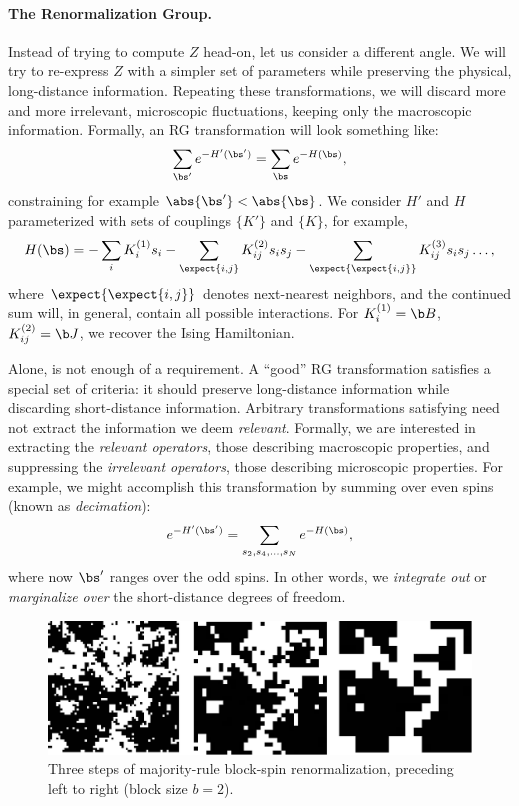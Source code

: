 \paragraph{The Renormalization Group.} Instead of trying to compute
$Z$ head-on, let us consider a different angle.  We will try to
re-express $Z$ with a simpler set of parameters while preserving the
physical, long-distance information. Repeating these transformations,
we will discard more and more irrelevant, microscopic fluctuations,
keeping only the macroscopic information. Formally, an RG
transformation will look something like:
\begin{equation}%
  \sum_{\bs'}e^{-H'(\bs')}=\sum_{\bs}e^{-H(\bs)},
  \label{eq:rg-transformation-general}
\end{equation}%
constraining for example $\abs{\bs'}<\abs{\bs}$. We consider $H'$ and
$H$ parameterized with sets of couplings $\{K'\}$ and $\{K\}$, for
example,%
\begin{equation}%
  H(\bs)=-\sum_i K^{(1)}_{i} s_i - \sum_{\expect{i,j}}K^{(2)}_{ij}s_i s_j-\sum_{\expect{\expect{i,j}}}K^{(3)}_{ij}s_i s_j\ldots,
\end{equation}%
where $\expect{\expect{i,j}}$ denotes next-nearest neighbors, and the
continued sum will, in general, contain all possible interactions. For
$K^{(1)}_i=\b B$, $K^{(2)}_{ij}=\b J$, we recover the Ising
Hamiltonian.

Alone,  is not enough of a
requirement. A ``good'' RG transformation satisfies a special set of
criteria: it should preserve long-distance information while
discarding short-distance information. Arbitrary transformations
satisfying  need not extract the
information we deem \textit{relevant}. Formally, we are interested in
extracting the \textit{relevant operators}, those describing
macroscopic properties, and suppressing the \textit{irrelevant
  operators}, those describing microscopic properties.  For example,
we might accomplish this transformation by summing over even spins
(known as \textit{decimation}):
\begin{equation}%
  e^{-H'(\bs')}=\sum_{s_2,s_4,\ldots,s_N} e^{-H(\bs)},
\end{equation}%
where now $\bs'$ ranges over the odd spins. In other words, we
\textit{integrate out} or \textit{marginalize over} the short-distance
degrees of freedom.

\begin{figure}[ht]
  \centering
  \includegraphics[width=.5\textwidth]{figures/block-rg.png}
  \caption{Three steps of majority-rule block-spin renormalization,
    preceding left to right (block size $b=2$).\label{fig:block-rg} }
\end{figure}

